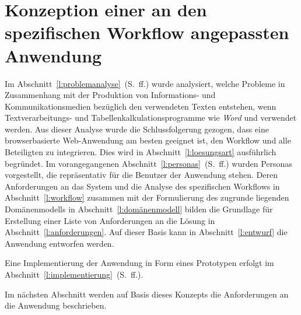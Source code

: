 \section{Konzeption einer an den spezifischen Workflow angepassten Anwendung}\label{l:konzeption}

Im Abschnitt~\ref{l:problemanalyse}~(S.\pageref{l:problemanalyse}~ff.) wurde analysiert, welche Probleme in Zusammenhang mit der Produktion von Informations- und Kommunikationsmedien bezüglich den verwendeten Texten entstehen, wenn Textverarbeitungs- und Tabellenkalkulationsprogramme wie  \emph{Word} und  verwendet werden. Aus dieser Analyse wurde die Schlussfolgerung gezogen, dass eine browserbasierte Web-Anwendung am besten geeignet ist, den Workflow und alle Beteiligten zu integrieren. Dies wird in Abschnitt~\ref{l:loesungsart} ausführlich begründet. Im vorangegangenen Abschnitt~\ref{l:personas}~(S.\pageref{l:personas}~ff.) wurden Personas vorgestellt, die repräsentativ für die Benutzer der Anwendung stehen. Deren Anforderungen an das System und die Analyse des spezifischen Workflows in Abschnitt~\ref{l:workflow} zusammen mit der Formulierung des zugrunde liegenden Domänenmodells in Abschnitt~\ref{l:domänenmodell} bilden die Grundlage für Erstellung einer Liste von Anforderungen an die Lösung in Abschnitt~\ref{l:anforderungen}. Auf dieser Basis kann in Abschnitt~\ref{l:entwurf} die Anwendung entworfen werden.

\bigskip

Eine Implementierung der Anwendung in Form eines Prototypen erfolgt im Abschnitt~\ref{l:implementierung}~(S.\pageref{l:implementierung}~ff.).







\bigskip

Im nächsten Abschnitt werden auf Basis dieses Konzepts die Anforderungen an die Anwendung beschrieben.

\pagebreak